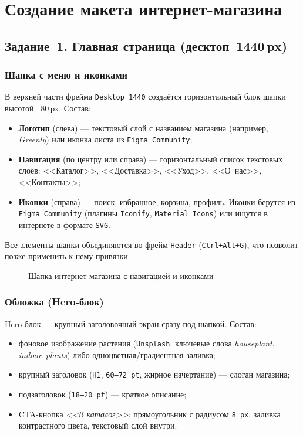 \chapter{Создание макета интернет-магазина}
\label{ch:practice}

\section{Задание~1. Главная страница (десктоп~1440\,px)}

\subsection{Шапка с меню и иконками}

В верхней части фрейма \texttt{Desktop~1440} создаётся горизонтальный
блок шапки высотой ~80\,px.
Состав:
\begin{itemize}
  \item \textbf{Логотип} (слева) --- текстовый слой с названием магазина
        (например, \textit{Greenly}) или иконка листа из
        \texttt{Figma~Community};
  \item \textbf{Навигация} (по центру или справа) --- горизонтальный
        список текстовых слоёв: <<Каталог>>, <<Доставка>>, <<Уход>>,
        <<О~нас>>, <<Контакты>>;
  \item \textbf{Иконки} (справа) --- поиск, избранное, корзина, профиль.
        Иконки берутся из \texttt{Figma~Community} (плагины
        \texttt{Iconify}, \texttt{Material~Icons}) или ищутся в
        интернете в формате \texttt{SVG}.
\end{itemize}
Все элементы шапки объединяются во фрейм \texttt{Header} (\texttt{Ctrl+Alt+G}),
что позволит позже применить к нему привязки.

\begin{figure}[h]
  \centering
  \caption{Шапка интернет-магазина с навигацией и иконками}
  \label{fig:header}
\end{figure}

\subsection{Обложка (Hero-блок)}

Hero-блок --- крупный заголовочный экран сразу под шапкой. Состав:
\begin{itemize}
  \item фоновое изображение растения (\texttt{Unsplash}, ключевые слова
        \textit{houseplant}, \textit{indoor~plants}) либо
        одноцветная/градиентная заливка;
  \item крупный заголовок (\texttt{H1}, \texttt{60--72\,pt}, жирное
        начертание) --- слоган магазина;
  \item подзаголовок (\texttt{18--20\,pt}) --- краткое описание;
  \item CTA-кнопка \textit{<<В каталог>>}: прямоугольник с радиусом
        \texttt{8\,px}, заливка контрастного цвета, текстовый слой
        внутри.
\end{itemize}

